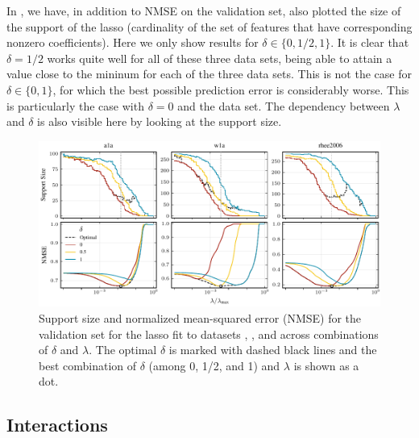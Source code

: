 In , we have, in addition to NMSE on the validation set, also
plotted the size of the support of the lasso (cardinality of the set of features that have
corresponding nonzero coefficients). Here we only show results for \(\delta \in \{0, 1/2,
1\}\). It is clear that \(\delta = 1/2\) works quite well for all of these three data sets,
being able to attain a value close to the mininum for each of the three data sets. This is
not the case for \(\delta \in \{0, 1\}\), for which the best possible prediction error is
considerably worse. This is particularly the case with \(\delta =0\) and the 
data set. The dependency between \(\lambda\) and \(\delta\) is also visible here by looking
at the support size.

\begin{figure}[htpb]
  \centering
  \includegraphics[]{plots/hyperopt_paths.pdf}
  \caption{%
    Support size and normalized mean-squared error (NMSE) for the validation set for the lasso
    fit to datasets , , and  across combinations of
    \(\delta\) and \(\lambda\). The optimal \(\delta\) is marked with dashed black lines and
    the best combination of \(\delta\) (among 0, 1/2, and 1) and \(\lambda\) is shown as a dot.
  }
  \label{fig:hyperopt-support}
\end{figure}

\subsection{Interactions}%
\label{sec:additional-experiments-interactions}

